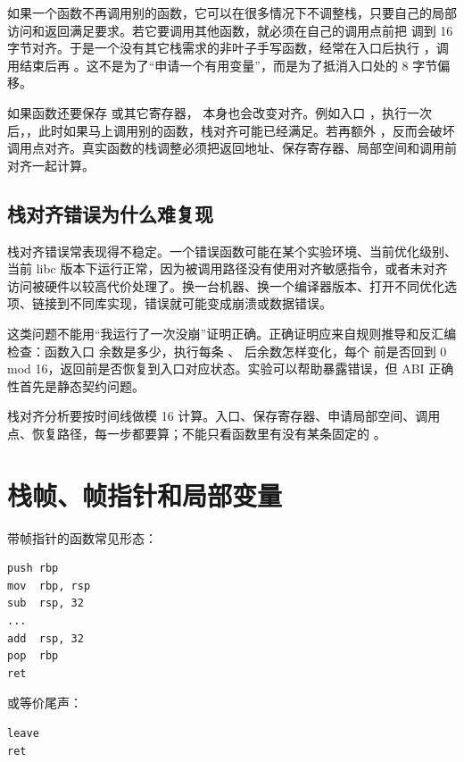 如果一个函数不再调用别的函数，它可以在很多情况下不调整栈，只要自己的局部访问和返回满足要求。若它要调用其他函数，就必须在自己的调用点前把  调到 16 字节对齐。于是一个没有其它栈需求的非叶子手写函数，经常在入口后执行 ，调用结束后再 。这不是为了“申请一个有用变量”，而是为了抵消入口处的 8 字节偏移。

如果函数还要保存  或其它寄存器， 本身也会改变对齐。例如入口 ，执行一次  后，，此时如果马上调用别的函数，栈对齐可能已经满足。若再额外 ，反而会破坏调用点对齐。真实函数的栈调整必须把返回地址、保存寄存器、局部空间和调用前对齐一起计算。

\subsection{栈对齐错误为什么难复现}

栈对齐错误常表现得不稳定。一个错误函数可能在某个实验环境、当前优化级别、当前 libc 版本下运行正常，因为被调用路径没有使用对齐敏感指令，或者未对齐访问被硬件以较高代价处理了。换一台机器、换一个编译器版本、打开不同优化选项、链接到不同库实现，错误就可能变成崩溃或数据错误。

这类问题不能用“我运行了一次没崩”证明正确。正确证明应来自规则推导和反汇编检查：函数入口  余数是多少，执行每条 、 后余数怎样变化，每个  前是否回到 0 mod 16，返回前是否恢复到入口对应状态。实验可以帮助暴露错误，但 ABI 正确性首先是静态契约问题。

\begin{keyidea}
栈对齐分析要按时间线做模 16 计算。入口、保存寄存器、申请局部空间、调用点、恢复路径，每一步都要算；不能只看函数里有没有某条固定的 。
\end{keyidea}

\section{栈帧、帧指针和局部变量}

带帧指针的函数常见形态：

\begin{lstlisting}
push rbp
mov  rbp, rsp
sub  rsp, 32
...
add  rsp, 32
pop  rbp
ret
\end{lstlisting}

或等价尾声：

\begin{lstlisting}
leave
ret
\end{lstlisting}

